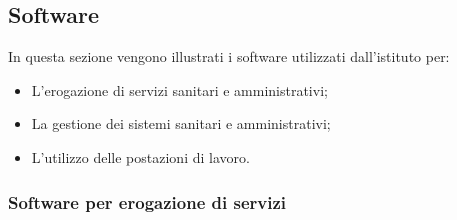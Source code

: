 \documentclass[12pt, a4paper, titlepage]{report}
\begin{document}
	
	\subsection{Software} \label{software}
	
	In questa sezione vengono illustrati i software utilizzati dall'istituto per:
	\begin{itemize}
		\item L'erogazione di servizi sanitari e amministrativi;
		\item La gestione dei sistemi sanitari e amministrativi;
		\item L'utilizzo delle postazioni di lavoro.
	\end{itemize}
	
	\subsubsection{Software per erogazione di servizi}
	
\end{document}
